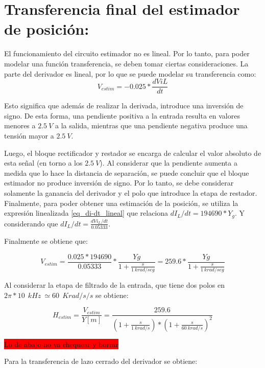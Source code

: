 \section{Transferencia final del estimador de posici\'{o}n:}

El funcionamiento del circuito estimador no es lineal.  Por lo tanto, para poder modelar una función transferencia, se deben tomar ciertas consideraciones. La parte del derivador es lineal, por lo que se puede modelar su transferencia como:
\begin{equation}
	V_{estim}=-0.025*\frac{dViL}{dt} 
\end{equation}

Esto significa que además de realizar la derivada, introduce una inversión de signo. De esta forma, una pendiente positiva a la entrada resulta en valores menores a $2.5\:V$ a la salida, mientras que una pendiente negativa produce una tensión mayor a $2.5\:V$.

Luego, el bloque rectificador y restador se encarga de calcular el valor absoluto de esta señal (en torno a los $2.5\:V$). Al considerar que la pendiente aumenta a medida que lo hace la distancia de separación, se puede concluir que el bloque estimador no produce inversión de signo. Por lo tanto, se debe considerar solamente la ganancia del derivador y el polo que introduce la etapa de restador. Finalmente, para poder obtener una estimación de la posición, se utiliza la expresión linealizada \ref{eq_di-dt_lineal} que relaciona $dI_{L}/dt = 194690 * Y_{g}$. Y considerando que $dI_{L}/dt = \frac{dVi_{L}/dt}{0.05333}$.

Finalmente se obtiene que:

\begin{equation}
 V_{estim}=\frac{0.025*194690}{0.05333} * \frac{Yg}{1 + \frac{s}{1\:krad/seg}}=259.6*\frac{Yg}{1 + \frac{s}{1\:krad/seg}}	
\end{equation}

\noindent Al considerar la etapa de filtrado de la entrada, que tiene dos polos en $2\pi *10\: \:{kHz}\ \simeq 60\: \:{Krad/s}/s$ se obtiene:

\begin{equation} \label{eq_TLC_deriv_7}
	H_{estim}=\frac{V_{estim}}{Y[m]}=\frac{259.6}{(1+\frac{s}{1\: krad/s})*{(1+\frac{s}{60\: krad/s})}^2}
\end{equation}

\colorbox{red}{Lo de abajo no va chequear y borrar}



\noindent Para la transferencia de lazo cerrado del derivador se obtiene:


